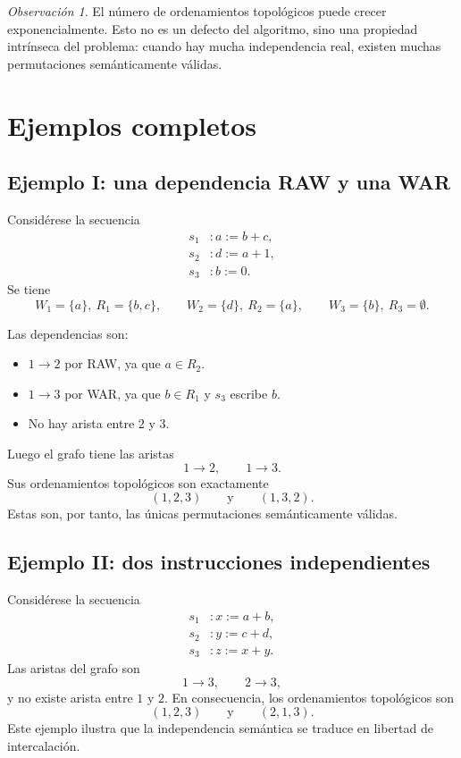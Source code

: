 \documentclass[letterpaper,oneside]{article}
\theoremstyle{remark}
\newtheorem{remark}[definition]{Observación}
\newcommand{\reads}[1]{R_{#1}}
\newcommand{\writes}[1]{W_{#1}}
\begin{document}
\begin{remark}
El número de ordenamientos topológicos puede crecer exponencialmente. Esto no es un defecto del algoritmo, sino una propiedad intrínseca del problema: cuando hay mucha independencia real, existen muchas permutaciones semánticamente válidas.
\end{remark}

\section{Ejemplos completos}

\subsection{Ejemplo I: una dependencia RAW y una WAR}

Considérese la secuencia
\[
\begin{aligned}
  s_1 &: a := b + c, \\
  s_2 &: d := a + 1, \\
  s_3 &: b := 0.
\end{aligned}
\]
Se tiene
\[
  \writes{1}=\{a\},\ \reads{1}=\{b,c\},
  \qquad
  \writes{2}=\{d\},\ \reads{2}=\{a\},
  \qquad
  \writes{3}=\{b\},\ \reads{3}=\emptyset.
\]

Las dependencias son:
\begin{itemize}[leftmargin=2.2em]
  \item $1 \to 2$ por RAW, ya que $a \in \reads{2}$.
  \item $1 \to 3$ por WAR, ya que $b \in \reads{1}$ y $s_3$ escribe $b$.
  \item No hay arista entre $2$ y $3$.
\end{itemize}

Luego el grafo tiene las aristas
\[
  1 \to 2,
  \qquad
  1 \to 3.
\]
Sus ordenamientos topológicos son exactamente
\[
  (1,2,3)
  \qquad\text{y}\qquad
  (1,3,2).
\]
Estas son, por tanto, las únicas permutaciones semánticamente válidas.

\subsection{Ejemplo II: dos instrucciones independientes}

Considérese la secuencia
\[
\begin{aligned}
  s_1 &: x := a + b, \\
  s_2 &: y := c + d, \\
  s_3 &: z := x + y.
\end{aligned}
\]
Las aristas del grafo son
\[
  1 \to 3,
  \qquad
  2 \to 3,
\]
y no existe arista entre $1$ y $2$. En consecuencia, los ordenamientos topológicos son
\[
  (1,2,3)
  \qquad\text{y}\qquad
  (2,1,3).
\]
Este ejemplo ilustra que la independencia semántica se traduce en libertad de intercalación.
\end{document}
